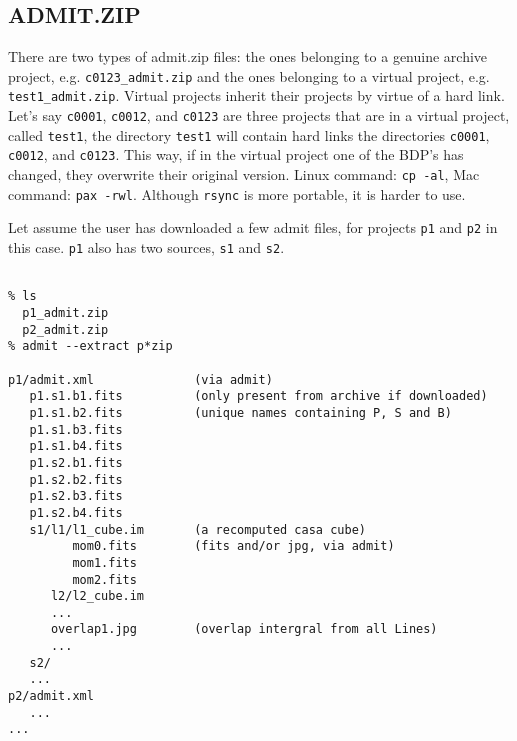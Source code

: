 \documentclass{article}
\begin{document}
\subsection{ADMIT.ZIP}


There are two types of admit.zip files: the ones belonging to a genuine archive project, e.g.
{\tt c0123\_admit.zip} and the ones belonging to a virtual project, e.g.
{\tt test1\_admit.zip}.  Virtual projects inherit their projects by virtue of a hard
link. Let's say {\tt c0001}, {\tt c0012}, and {\tt c0123} are three projects that
are in a virtual project, called {\tt test1}, the directory {\tt test1} will contain
hard links the directories {\tt c0001}, {\tt c0012}, and {\tt c0123}. This way,
if in the virtual project one of the BDP's has changed, they overwrite their original
version. Linux command: {\tt cp -al}, Mac command: {\tt pax -rwl}. Although
{\tt rsync} is more portable, it is harder to use. 

Let assume the user has downloaded a few admit files, for projects 
{\tt p1} and {\tt p2} in this case. {\tt p1} also has two sources,
{\tt s1} and {\tt s2}.

\footnotesize
\begin{verbatim}

% ls
  p1_admit.zip
  p2_admit.zip
% admit --extract p*zip

p1/admit.xml              (via admit)
   p1.s1.b1.fits          (only present from archive if downloaded)
   p1.s1.b2.fits          (unique names containing P, S and B)
   p1.s1.b3.fits
   p1.s1.b4.fits
   p1.s2.b1.fits
   p1.s2.b2.fits
   p1.s2.b3.fits
   p1.s2.b4.fits
   s1/l1/l1_cube.im       (a recomputed casa cube)
         mom0.fits        (fits and/or jpg, via admit)
         mom1.fits
         mom2.fits
      l2/l2_cube.im
      ...
      overlap1.jpg        (overlap intergral from all Lines)
      ...
   s2/
   ...
p2/admit.xml
   ...
...

\end{verbatim}
\normalsize
\end{document}
